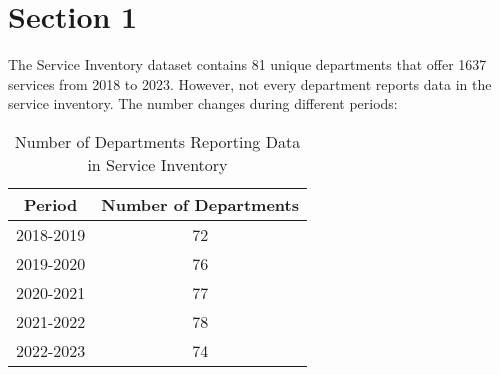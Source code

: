\section{Section 1}

The Service Inventory dataset contains 81 unique departments that offer 1637 services from 2018 to 2023. However, not every department reports data in the service inventory. The number changes during different periods:

\begin{table}
    \centering
    \begin{tabular}{|c|c|}
    \hline
    Period & Number of Departments \\ \hline
    2018-2019 & 72 \\ \hline
    2019-2020 & 76 \\ \hline
    2020-2021 & 77 \\ \hline
    2021-2022 & 78 \\ \hline
    2022-2023 & 74 \\ \hline
    \end{tabular}
    \caption{Number of Departments Reporting Data in Service Inventory}
    \end{table}